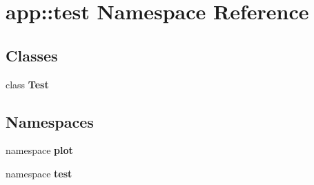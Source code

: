 \section{app::test Namespace Reference}
\label{namespaceapp_1_1test}


\subsection*{Classes}
\begin{CompactItemize}
\item 
class {\bf Test}
\end{CompactItemize}
\subsection*{Namespaces}
\begin{CompactItemize}
\item 
namespace {\bf plot}
\item 
namespace {\bf test}
\end{CompactItemize}
